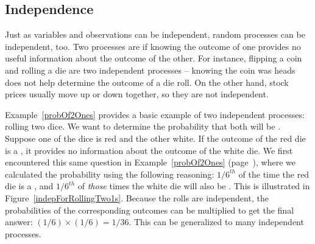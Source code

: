 %
%
%


\subsection{Independence}
\label{probabilityIndependence}

Just as variables and observations can be independent, random processes can be independent, too. Two processes are  if knowing the outcome of one provides no useful information about the outcome of the other. For instance, flipping a coin and rolling a die are two independent processes -- knowing the coin was heads does not help determine the outcome of a die roll. On the other hand, stock prices usually move up or down together, so they are not independent.

Example~\ref{probOf2Ones} provides a basic example of two independent processes: rolling two dice. We want to determine the probability that both will be . Suppose one of the dice is red and the other white. If the outcome of the red die is a , it provides no information about the outcome of the white die. We first encountered this same question in Example~\ref{probOf2Ones} (page~\pageref{probOf2Ones}), where we calculated the probability using the following reasoning: $1/6^{th}$ of the time the red die is a , and $1/6^{th}$ of \emph{those} times the white die will also be . This is illustrated in Figure~\ref{indepForRollingTwo1s}. Because the rolls are independent, the probabilities of the corresponding outcomes can be multiplied to get the final answer: $(1/6)\times(1/6)=1/36$. This can be generalized to many independent processes.

